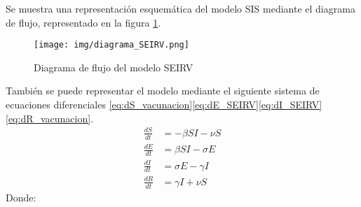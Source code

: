 Se muestra una representación esquemática del modelo SIS mediante el diagrama de flujo, representado en la figura \ref{fig:eje SEIRV}.

\begin{figure}[H]
    \centering
    \texttt{[image: img/diagrama\_SEIRV.png]}
    \caption{Diagrama de flujo del modelo SEIRV}
    \label{fig:eje SEIRV}
    \vspace{0.5cm} %
\end{figure}
También se puede representar el modelo mediante el siguiente sistema de ecuaciones diferenciales \eqref{eq:dS_vacunacion}\eqref{eq:dE_SEIRV}\eqref{eq:dI_SEIRV}\eqref{eq:dR_vacunacion}.
\begin{align}
\frac{dS}{dt} &= -\beta SI - \nu S \label{eq:dS_vacunacion} \\
\frac{dE}{dt} &= \beta SI - \sigma E \label{eq:dE_SEIRV} \\
\frac{dI}{dt} &= \sigma E - \gamma I \label{eq:dI_SEIRV} \\
\frac{dR}{dt} &= \gamma I + \nu S \label{eq:dR_vacunacion}
\end{align}
Donde:
